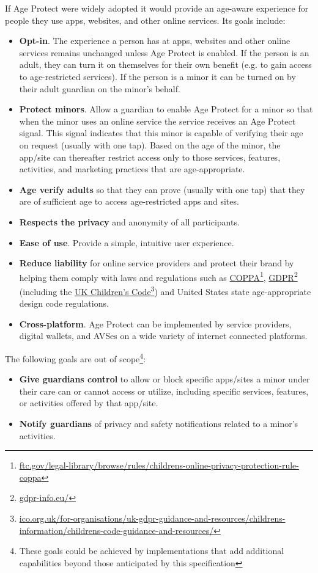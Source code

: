\documentclass[11pt, oneside]{article}   	%
\newcommand{\hyperfootnote}[1][]{\def\ArgI{{#1}}\hyperfootnoteRelay}
\newcommand\hyperfootnoteRelay[2][]{\href{#1#2}{\ArgI}\footnote{\href{#1#2}{#2}}}
\begin{document}
If Age Protect were widely adopted it would provide an age-aware experience for people they use apps, websites, and other online services. Its goals include:
\begin{itemize}
	\item \textbf{Opt-in}. The experience a person has at apps, websites and other online services remains unchanged unless Age Protect is enabled. If the person is an adult, they can turn it on themselves for their own benefit (e.g. to gain access to age-restricted services). If the person is a minor it can be turned on by their adult guardian on the minor's behalf. 
	\item \textbf{Protect minors}. Allow a guardian to enable Age Protect for a minor so that when the minor uses an online service the service receives an Age Protect signal. This signal indicates that this minor is capable of verifying their age on request (usually with one tap). Based on the age of the minor, the app/site can thereafter restrict access only to those services, features, activities, and marketing practices that are age-appropriate.
	\item \textbf{Age verify adults} so that they can prove (usually with one tap) that they are of sufficient age to access age-restricted apps and sites.
	\item \textbf{Respects the privacy} and anonymity of all participants.
	\item \textbf{Ease of use}. Provide a simple, intuitive user experience.
	\item \textbf{Reduce liability} for online service providers and protect their brand by helping them comply with laws and regulations such as \hyperfootnote[COPPA][https:]{ftc.gov/legal-library/browse/rules/childrens-online-privacy-protection-rule-coppa}, \hyperfootnote[GDPR][https://]{gdpr-info.eu/} (including the \hyperfootnote[UK Children's Code][https://]{ico.org.uk/for-organisations/uk-gdpr-guidance-and-resources/childrens-information/childrens-code-guidance-and-resources/}) and United States state age-appropriate design code regulations.
	\item \textbf{Cross-platform}. Age Protect can be implemented by service providers, digital wallets, and AVSes on a wide variety of internet connected platforms.
\end{itemize}
The following goals are out of scope\footnote{These goals could be achieved by implementations that add additional capabilities beyond those anticipated by this specification}:
\begin{itemize}
	\item \textbf{Give guardians control} to allow or block specific apps/sites a minor under their care can or cannot access or utilize, including specific services, features, or activities offered by that app/site.
	\item \textbf{Notify guardians} of privacy and safety notifications related to a minor's activities.
\end{itemize}
\end{document}
